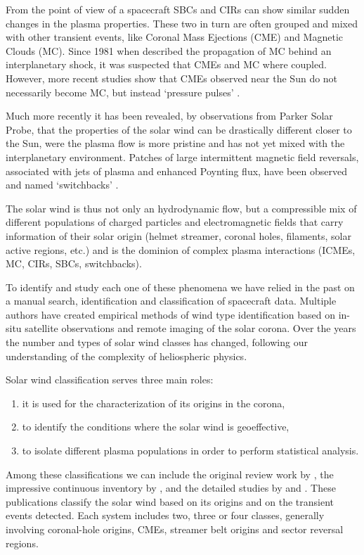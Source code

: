 \documentclass[utf8]{frontiersSCNS} %
\begin{document}
From the point of view of a spacecraft SBCs and CIRs can show similar sudden changes in the plasma properties. These two in turn are often grouped and mixed with other transient events, like Coronal Mass Ejections (CME) and Magnetic Clouds (MC). Since 1981 when \citep{Burlaga1981} described the propagation of MC behind an interplanetary shock, it was suspected that CMEs and MC where coupled. However, more recent studies show that CMEs observed near the Sun do not necessarily become MC, but instead `pressure pulses' \citep{Gopalswamy1998,Wu2006}.

Much more recently it has been revealed, by observations from Parker Solar Probe, that the properties of the solar wind can be drastically different closer to the Sun, were the plasma flow is more pristine and has not yet mixed with the interplanetary environment. Patches of large intermittent magnetic field reversals, associated with jets of plasma and enhanced Poynting flux, have been observed and named `switchbacks' \citep{Bale2019,Bandyopadhyay2020}.

The solar wind is thus not only an hydrodynamic flow, but a compressible mix of different populations of charged particles and electromagnetic fields that carry information of their solar origin (helmet streamer, coronal holes, filaments, solar active regions, etc.) and is the dominion of complex plasma interactions (ICMEs, MC, CIRs, SBCs, switchbacks).

To identify and study each one of these phenomena we have relied in the past on a manual search, identification and classification of spacecraft data. Multiple authors have created empirical methods of wind type identification based on in-situ satellite observations and remote imaging of the solar corona. Over the years the number and types of solar wind classes has changed, following our understanding of the complexity of heliospheric physics.

Solar wind classification serves three main roles:
\begin{enumerate}
	\item it is used for the characterization of its origins in the corona,
	\item to identify the conditions where the solar wind is geoeffective,
	\item to isolate different plasma populations in order to perform statistical analysis.
\end{enumerate}

Among these classifications we can include the original review work by \citep{Withbroe1986}, the impressive continuous inventory by \citep{Richardson2000,Richardson2010,Richardson2012}, and the detailed studies by \citep{Zhao2009} and \citep{Xu2015b}. These publications classify the solar wind based on its origins and on the transient events detected. Each system includes two, three or four classes, generally involving coronal-hole origins, CMEs, streamer belt origins and sector reversal regions.
\end{document}
